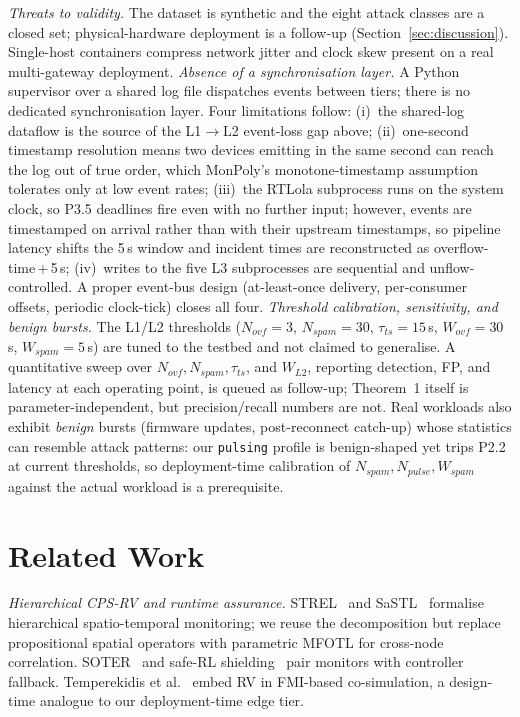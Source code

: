 \documentclass[runningheads]{llncs}
\begin{document}
\emph{Threats to validity.}
The dataset is synthetic and the eight attack classes are a closed
set; physical-hardware deployment is a follow-up
(Section~\ref{sec:discussion}).  Single-host containers compress
network jitter and clock skew present on a real multi-gateway
deployment.
\emph{Absence of a synchronisation layer.}
A Python supervisor over a shared log file dispatches events
between tiers; there is no dedicated synchronisation layer.
Four limitations follow: (i)~the shared-log dataflow is the
source of the L1$\to$L2 event-loss gap above; (ii)~one-second
timestamp resolution means two devices emitting in the same
second can reach the log out of true order, which MonPoly's
monotone-timestamp assumption tolerates only at low event
rates; (iii)~the RTLola subprocess runs on the system clock, so P3.5 deadlines fire even with no further input; however, events are timestamped on arrival rather than with
their upstream timestamps, so pipeline latency shifts the 5\,s window and
incident times are reconstructed as overflow-time\,+\,5\,s; (iv)~writes to the five
L3 subprocesses are sequential and unflow-controlled.  A proper
event-bus design (at-least-once delivery, per-consumer offsets,
periodic clock-tick) closes all four.
\emph{Threshold calibration, sensitivity, and benign bursts.}
The L1/L2 thresholds
($N_{\mathit{ovf}}{=}3$, $N_{\mathit{spam}}{=}30$,
$\tau_{ts}{=}15$\,s, $W_{\mathit{ovf}}{=}30$\,s,
$W_{\mathit{spam}}{=}5$\,s) are tuned to the testbed and not
claimed to generalise.  A quantitative sweep over
$N_{\mathit{ovf}}, N_{\mathit{spam}}, \tau_{ts}$, and $W_{L2}$,
reporting detection, FP, and latency at each operating point,
is queued as follow-up; Theorem~1 itself is
parameter-independent, but precision/recall numbers are not.
Real workloads also exhibit \emph{benign} bursts (firmware
updates, post-reconnect catch-up) whose statistics can resemble
attack patterns: our \texttt{pulsing} profile is benign-shaped
yet trips P2.2 at current thresholds, so deployment-time
calibration of $N_{\mathit{spam}}, N_{\mathit{pulse}},
W_{\mathit{spam}}$ against the actual workload is a prerequisite.



\section{Related Work}
\label{sec:related}

\emph{Hierarchical CPS-RV and runtime assurance.}
STREL~\cite{strel2017} and SaSTL~\cite{sastl2020} formalise
hierarchical spatio-temporal monitoring; we reuse the
decomposition but replace propositional spatial operators with
parametric MFOTL for cross-node correlation.  SOTER~\cite{desai2019soter}
and safe-RL shielding~\cite{shielding2018} pair monitors with
controller fallback.  Temperekidis
et al.~\cite{temperekidis2022fmirv} embed RV in FMI-based
co-simulation, a design-time analogue to our deployment-time
edge tier.
\end{document}
